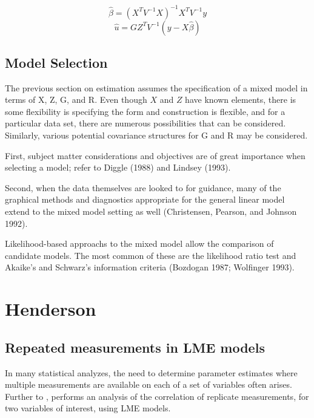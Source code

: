 \documentclass[12pt, a4paper]{report}
\theoremstyle{plain}
\theoremstyle{definition}
\theoremstyle{remark}
\begin{document}
\begin{equation}
\hat{\beta} = (X^{T}V^{-1}X)^{-1}X^{T}V^{-1}y
\end{equation}
\begin{equation}
\hat{u} = GZ^{T}V^{-1}(y-X\hat{\beta})
\end{equation}



\section{Model Selection} The previous section on estimation assumes
the specification of a mixed model in terms of X, Z, G, and R.
Even though $X$ and $Z$ have known elements, there is some
flexibility is specifying the form and construction is flexible,
and for a particular data set, there are numerous possibilities
that can be considered. Similarly, various potential covariance
structures for G and R may be considered.

First, subject matter considerations and objectives are of great
importance when selecting a model; refer to Diggle (1988) and
Lindsey (1993).

Second, when the data themselves are looked to for guidance, many
of the graphical methods and diagnostics appropriate for the
general linear model extend to the mixed model setting as well
(Christensen, Pearson, and Johnson 1992).

Likelihood-based approachs to the mixed model allow the comparison
of candidate models. The most common of these are the likelihood
ratio test and Akaike's and Schwarz's information criteria
(Bozdogan 1987; Wolfinger 1993).



\chapter{Henderson}




\section{Repeated measurements in LME models}

In many statistical analyzes, the need to determine parameter estimates where multiple measurements are available on each of a set of variables often arises. Further to \citet{lam}, \citet{hamlett} performs an analysis of the correlation of replicate measurements, for two variables of interest, using LME models.
\end{document}
